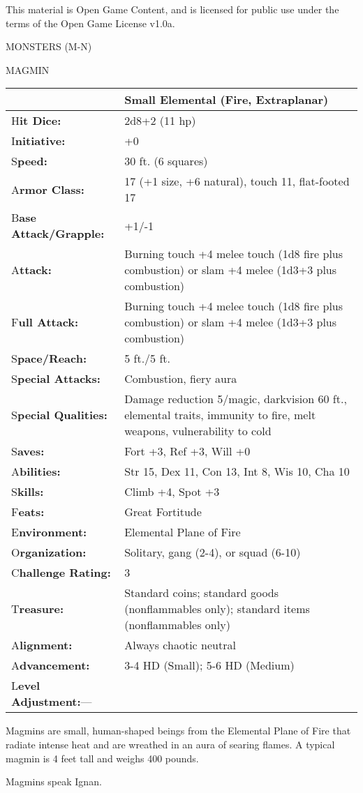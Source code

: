 \documentclass{article}
\begin{document}
This material is Open Game Content, and is licensed for public use under the terms 
of the Open Game License v1.0a.

{\LARGE{}MONSTERS (M-N)}

\vspace{12pt}
{\LARGE{}MAGMIN}

\begin{tabular}{|>{\raggedright}p{91pt}|>{\raggedright}p{216pt}|}
\hline
  & Small Elemental (Fire, Extraplanar)\tabularnewline
\hline
H\textbf{it Dice:} & 2d8+2 (11 hp)\tabularnewline
\hline
I\textbf{nitiative:} & +0\tabularnewline
\hline
S\textbf{peed:} & 30 ft. (6 squares)\tabularnewline
\hline
A\textbf{rmor Class:} & 17 (+1 size, +6 natural), touch 11, flat-footed 17\tabularnewline
\hline
B\textbf{ase Attack/Grapple:} & +1/-1\tabularnewline
\hline
A\textbf{ttack:} & Burning touch +4 melee touch (1d8 fire plus combustion) or slam 
+4 melee (1d3+3 plus combustion)\tabularnewline
\hline
F\textbf{ull Attack:} & Burning touch +4 melee touch (1d8 fire plus combustion) 
or slam +4 melee (1d3+3 plus combustion)\tabularnewline
\hline
S\textbf{pace/Reach:} & 5 ft./5 ft.\tabularnewline
\hline
S\textbf{pecial Attacks:} & Combustion, fiery aura\tabularnewline
\hline
S\textbf{pecial Qualities:} & Damage reduction 5/magic, darkvision 60 ft., elemental 
traits, immunity to fire, melt weapons, vulnerability to cold\tabularnewline
\hline
S\textbf{aves:} & Fort +3, Ref +3, Will +0\tabularnewline
\hline
A\textbf{bilities:} & Str 15, Dex 11, Con 13, Int 8, Wis 10, Cha 10\tabularnewline
\hline
S\textbf{kills:} & Climb +4, Spot +3\tabularnewline
\hline
F\textbf{eats:} & Great Fortitude\tabularnewline
\hline
E\textbf{nvironment:} & Elemental Plane of Fire\tabularnewline
\hline
O\textbf{rganization:} & Solitary, gang (2-4), or squad (6-10)\tabularnewline
\hline
C\textbf{hallenge Rating:} & 3\tabularnewline
\hline
T\textbf{reasure:} & Standard coins; standard goods (nonflammables only); standard 
items (nonflammables only)\tabularnewline
\hline
A\textbf{lignment:} & Always chaotic neutral\tabularnewline
\hline
A\textbf{dvancement:} & 3-4 HD (Small); 5-6 HD (Medium)\tabularnewline
\hline
L\textbf{evel Adjustment:}--- & \tabularnewline
\hline
\end{tabular}

Magmins are small, human-shaped beings from the Elemental Plane of Fire that radiate 
intense heat and are wreathed in an aura of searing flames. A typical magmin is 
4 feet tall and weighs 400 pounds.

Magmins speak Ignan.
\end{document}
